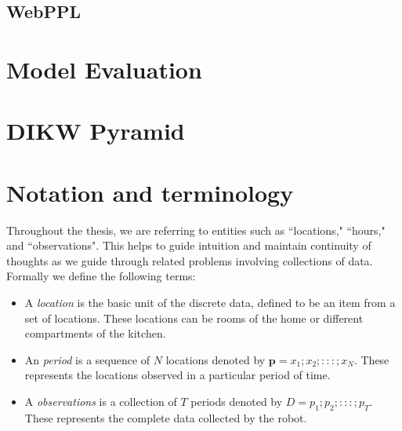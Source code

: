 \subsection{WebPPL}

\section{Model Evaluation}

\section{DIKW Pyramid }

\section{Notation and terminology}
Throughout the thesis, we are referring to entities such as ``locations," ``hours," and ``observations".
This helps to guide intuition and maintain continuity of thoughts as we guide through related problems involving collections of data.
Formally we define the following terms:
\begin{itemize}
	\item A \emph{location} is the basic unit of the discrete data, defined to be an item from a set of locations. These locations can be rooms of the home or different compartments of the kitchen. 
	\item An \emph{period} is a sequence of $N$ locations denoted by $\textbf{p} = {x_1;x_2;:::;x_N}$. These represents the locations observed in a particular period of time.
	\item A \emph{observations} is a collection of $T$ periods denoted by $ D = {p_1;p_2;:::;p_T}$. These represents the complete data collected by the robot.
\end{itemize}

